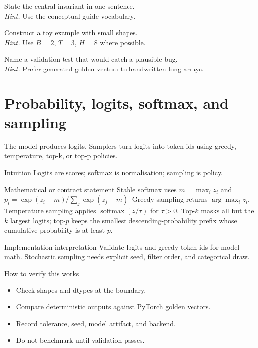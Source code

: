 \begin{chapterexercises}
\item State the central invariant in one sentence.\\
\textit{Hint.} Use the conceptual guide vocabulary.
\item Construct a toy example with small shapes.\\
\textit{Hint.} Use $B=2$, $T=3$, $H=8$ where possible.
\item Name a validation test that would catch a plausible bug.\\
\textit{Hint.} Prefer generated golden vectors to handwritten long arrays.
\end{chapterexercises}

\chapter{Probability, logits, softmax, and sampling}
\label{ch:probability-sampling}
The model produces logits. Samplers turn logits into token ids using greedy, temperature, top-k, or top-p policies.



\begin{intuitionbox}{Intuition}
Logits are scores; softmax is normalisation; sampling is policy.
\end{intuitionbox}

\begin{definitionbox}{Mathematical or contract statement}
Stable softmax uses \(m=\max_i z_i\) and \(p_i=\exp(z_i-m)/\sum_j\exp(z_j-m)\). Greedy sampling returns \(\arg\max_i z_i\). Temperature sampling applies \(\operatorname{softmax}(z/\tau)\) for \(\tau>0\). Top-\(k\) masks all but the \(k\) largest logits; top-\(p\) keeps the smallest descending-probability prefix whose cumulative probability is at least \(p\).
\end{definitionbox}

\begin{implementationbox}{Implementation interpretation}
Validate logits and greedy token ids for model math. Stochastic sampling needs explicit seed, filter order, and categorical draw.
\end{implementationbox}

\begin{verificationbox}{How to verify this works}
\begin{itemize}
\item Check shapes and dtypes at the boundary.
\item Compare deterministic outputs against PyTorch golden vectors.
\item Record tolerance, seed, model artifact, and backend.
\item Do not benchmark until validation passes.
\end{itemize}
\end{verificationbox}

